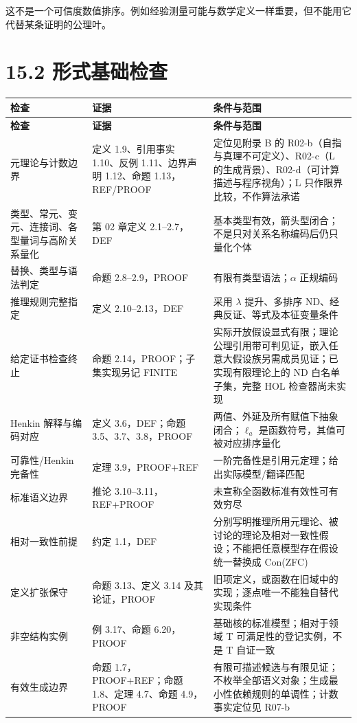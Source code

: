 \documentclass[UTF8,a4paper,zihao=-4,fontset=windows,openany]{ctexbook}
\begin{document}
这不是一个可信度数值排序。例如经验测量可能与数学定义一样重要，但不能用它代替某条证明的公理叶。

\section{15.2 形式基础检查}
\begingroup\small\setlength{\tabcolsep}{4pt}
\begin{longtable}{>{\raggedright\arraybackslash}p{}>{\raggedright\arraybackslash}p{}>{\raggedright\arraybackslash}p{}}
\toprule
\textbf{检查} & \textbf{证据} & \textbf{条件与范围} \\
\midrule
\endfirsthead
\toprule
\textbf{检查} & \textbf{证据} & \textbf{条件与范围} \\
\midrule
\endhead
\bottomrule
\endfoot
\bottomrule
\endlastfoot
元理论与计数边界 & 定义 1.9、引用事实 1.10、反例 1.11、边界声明 1.12、命题 1.13，REF/PROOF & 定位见附录 B 的 R02-b（自指与真理不可定义）、R02-c（L 的生成背景）、R02-d（可计算描述与程序视角）；L 只作限界比较，不作算法承诺 \\
类型、常元、变元、连接词、各型量词与高阶关系量化 & 第 02 章定义 2.1–2.7，DEF & 基本类型有效，箭头型闭合；不是只对关系名称编码后仍只量化个体 \\
替换、类型与语法判定 & 命题 2.8–2.9，PROOF & 有限有类型语法；\(\alpha\) 正规编码 \\
推理规则完整指定 & 定义 2.10–2.13，DEF & 采用 \(\lambda\) 提升、多排序 ND、经典反证、等式及本征变量条件 \\
给定证书检查终止 & 命题 2.14，PROOF；子集实现另记 FINITE & 实际开放假设显式有限；理论公理引用带可判见证，嵌入任意大假设族另需成员见证；已实现有限理论上的 ND 白名单子集，完整 HOL 检查器尚未实现 \\
Henkin 解释与编码对应 & 定义 3.6，DEF；命题 3.5、3.7、3.8，PROOF & 两值、外延及所有赋值下抽象闭合；\(\ell_a\) 是函数符号，其值可被对应排序量化 \\
可靠性/Henkin 完备性 & 定理 3.9，PROOF+REF & 一阶完备性是引用元定理；给出实际模型/翻译匹配 \\
标准语义边界 & 推论 3.10–3.11，REF+PROOF & 未宣称全函数标准有效性可有效穷尽 \\
相对一致性前提 & 约定 1.1，DEF & 分别写明推理所用元理论、被讨论的理论及相对一致性假设；不能把任意模型存在假设统一替换成 Con(ZFC) \\
定义扩张保守 & 命题 3.13、定义 3.14 及其论证，PROOF & 旧项定义，或函数在旧域中的实现；逐点唯一不能独自替代实现条件 \\
非空结构实例 & 例 3.17、命题 6.20，PROOF & 基础核的标准模型；相对于领域 T 可满足性的登记实例，不是 T 自证一致 \\
有效生成边界 & 命题 1.7，PROOF+REF；命题 1.8、定理 4.7、命题 4.9，PROOF & 有限可描述候选与有限见证；不枚举全部语义对象；生成最小性依赖规则的单调性；计数事实定位见 R07-b \\
\end{longtable}
\endgroup
\end{document}

